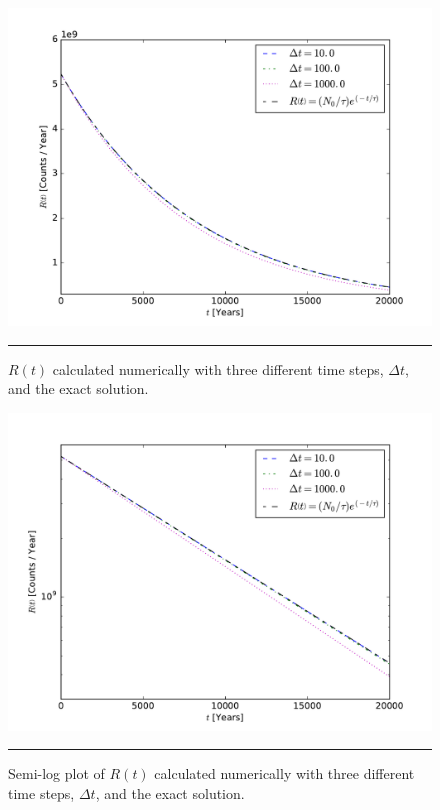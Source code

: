 \documentclass[notitlepage,aps,prd,nofootinbib]{revtex4-1}
\begin{document}
\begin{figure}[!htbc]
  \centering
  \includegraphics[width=.70\textwidth]{output/plot.pdf}
	{\par\nobreak\rule[9pt]{35em}{0.5pt}\vspace{-5mm}}
	\caption{$R\left(t\right)$ calculated numerically with three different time steps, $\Delta t$, and the exact solution.}
	\label{fig:plot}
\end{figure}

\begin{figure}[!htbc]
  \centering
  \includegraphics[width=.70\textwidth]{output/log_plot.pdf}
	{\par\nobreak\rule[9pt]{35em}{0.5pt}\vspace{-5mm}}
	\caption{Semi-log plot of $R\left(t\right)$ calculated numerically with three different time steps, $\Delta t$, and the exact solution.}
	\label{fig:log_plot}
\end{figure}
\end{document}
